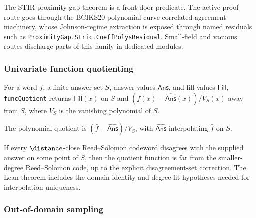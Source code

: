 \begin{remark}\label{rem:stir_proximity_gap_status}
    The STIR proximity-gap theorem is a front-door predicate.  The active proof route goes
    through the BCIKS20 polynomial-curve correlated-agreement machinery, whose Johnson-regime
    extraction is exposed through named residuals such as
    \texttt{ProximityGap.StrictCoeffPolysResidual}.  Small-field and vacuous routes discharge
    parts of this family in dedicated modules.
\end{remark}

\subsubsection{Univariate function quotienting}\label{sec:quotienting}

\begin{definition}\label{def:quotient}
    For a word $f$, a finite answer set $S$, answer values $\mathsf{Ans}$, and fill values
    $\mathsf{Fill}$, \texttt{funcQuotient} returns $\mathsf{Fill}(x)$ on $S$ and
    $(f(x)-\widehat{\mathsf{Ans}}(x))/V_S(x)$ away from $S$, where $V_S$ is the vanishing
    polynomial of $S$.
\end{definition}

\begin{definition}\label{def:poly_quotient}
    The polynomial quotient is $(\hat f-\widehat{\mathsf{Ans}})/V_S$, with
    $\widehat{\mathsf{Ans}}$ interpolating $\hat f$ on $S$.
\end{definition}

\begin{lemma}\label{lemma:quotienting}
    If every $\distance$-close Reed--Solomon codeword disagrees with the supplied answer on
    some point of $S$, then the quotient function is far from the smaller-degree
    Reed--Solomon code, up to the explicit disagreement-set correction.  The Lean theorem
    includes the domain-identity and degree-fit hypotheses needed for interpolation
    uniqueness.
\end{lemma}

\subsubsection{Out-of-domain sampling}\label{sec:out_of_domain_smpl}

